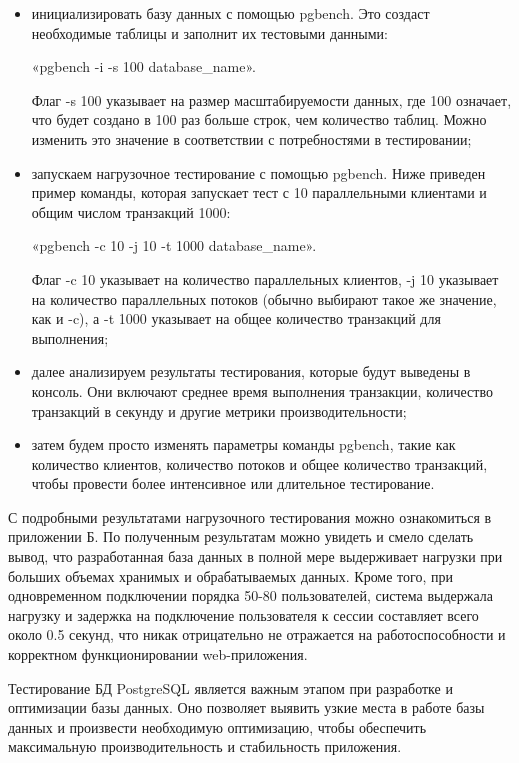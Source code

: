 \begin{itemize}
    \item инициализировать базу данных с помощью pgbench. Это создаст необходимые таблицы и заполнит их тестовыми данными:

    «pgbench -i -s 100 database\_name».

    Флаг -s 100 указывает на размер масштабируемости данных, где 100 означает, что будет создано в 100 раз больше строк, чем количество таблиц. Можно изменить это значение в соответствии с потребностями в тестировании;
    \item запускаем нагрузочное тестирование с помощью pgbench. Ниже приведен пример команды, которая запускает тест с 10 параллельными клиентами и общим числом транзакций 1000:
    
    «pgbench -c 10 -j 10 -t 1000 database\_name».
    
    Флаг -c 10 указывает на количество параллельных клиентов, -j 10 указывает на количество параллельных потоков (обычно выбирают такое же значение, как и -c), а -t 1000 указывает на общее количество транзакций для выполнения;
    \item далее анализируем результаты тестирования, которые будут выведены в консоль. Они включают среднее время выполнения транзакции, количество транзакций в секунду и другие метрики производительности;
    \item затем будем просто изменять параметры команды pgbench, такие как количество клиентов, количество потоков и общее количество транзакций, чтобы провести более интенсивное или длительное тестирование.
\end{itemize}

С подробными результатами нагрузочного тестирования можно ознакомиться в приложении Б. По полученным результатам можно увидеть и смело сделать вывод, что разработанная база данных в полной мере выдерживает нагрузки при больших объемах хранимых и обрабатываемых данных. Кроме того, при одновременном подключении порядка 50-80 пользователей, система выдержала нагрузку и задержка на подключение пользователя к сессии составляет всего около 0.5 секунд, что никак отрицательно не отражается на работоспособности и корректном функционировании web-приложения.

Тестирование БД PostgreSQL является важным этапом при разработке и оптимизации базы данных. Оно позволяет выявить узкие места в работе базы данных и произвести необходимую оптимизацию, чтобы обеспечить максимальную производительность и стабильность приложения.

